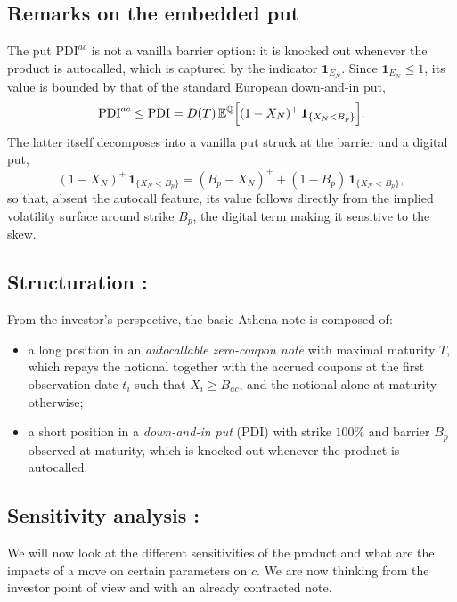 \documentclass[11pt,a4paper]{article}
\newcommand{\ind}{\mathbf{1}}
\begin{document}
\subsection{Remarks on the embedded put}

The put $\mathrm{PDI}^{ac}$ is not a vanilla barrier option: it is
knocked out whenever the product is autocalled, which is captured by the
indicator $\ind_{E_N}$. Since $\ind_{E_N} \leq 1$, its value is bounded by
that of the standard European down-and-in put,
\begin{equation}
  \mathrm{PDI}^{ac} \leq \mathrm{PDI}
  = D(T)\, \mathbb{E}^{\mathbb{Q}}\Bigl[ (1 - X_N)^+ \, \ind_{\{X_N < B_p\}} \Bigr].
\end{equation}
The latter itself decomposes into a vanilla put struck at the barrier
and a digital put,
\begin{equation}
  (1 - X_N)^+ \, \ind_{\{X_N < B_p\}}
  = (B_p - X_N)^+ + (1 - B_p)\, \ind_{\{X_N < B_p\}},
\end{equation}
so that, absent the autocall feature, its value follows directly from the
implied volatility surface around strike $B_p$, the digital term making
it sensitive to the skew.



\subsection{Structuration :}

From the investor's perspective, the basic Athena note is composed of:
\begin{itemize}
  \item a long position in an \emph{autocallable zero-coupon note} with
        maximal maturity $T$, which repays the notional together with the
        accrued coupons at the first observation date $t_i$ such that
        $X_i \geq B_{ac}$, and the notional alone at maturity otherwise;
  \item a short position in a \emph{down-and-in put} (PDI) with strike
        $100\%$ and barrier $B_p$ observed at maturity, which is knocked
        out whenever the product is autocalled.
\end{itemize}


\subsection{Sensitivity analysis :}

We will now look at the different sensitivities of the product and what are the impacts of a move on certain parameters on $c$. We are now thinking from the investor point of view and with an already contracted note.
\end{document}
